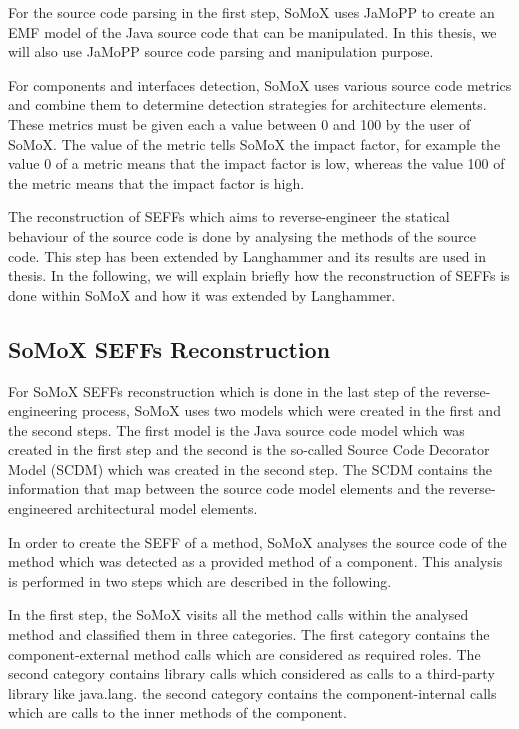 For the source code parsing in the first step, SoMoX uses JaMoPP to create an EMF model of the Java source code that can be manipulated. In this thesis, we will also use JaMoPP source code parsing and manipulation purpose.

For components and interfaces detection, SoMoX uses various source code metrics and combine them to determine detection strategies for architecture elements. These metrics must be given each a value between 0 and 100 by the user of SoMoX. The value of the metric tells SoMoX the impact factor, for example the value 0 of a metric means that the impact factor is low, whereas the value 100 of the metric means that the impact factor is high. 

The reconstruction of SEFFs which aims to reverse-engineer the statical behaviour of the source code is done by analysing the methods of the source code. This step has been extended by Langhammer \cite{langhammer2017automated} and its results are used in thesis. In the following, we will explain briefly how the reconstruction of SEFFs is done within SoMoX and how it was extended by Langhammer.

\subsection{SoMoX SEFFs Reconstruction}  
\label{sec:SoMoX SEFFs Reconstruction}
For SoMoX SEFFs reconstruction which is done in the last step of the reverse-engineering process, SoMoX uses two models which were created in the first and the second steps. The first model is the Java source code model which was created in the first step and the second is the so-called Source Code Decorator Model (SCDM) which was created in the second step. The SCDM contains the information that map between the source code model elements and the reverse-engineered architectural model elements.

In order to create the SEFF of a method, SoMoX analyses the source code of the method which was detected as a provided method of a component. This analysis is performed in two steps which are described in the following.

In the first step, the SoMoX visits all the method calls within the analysed method and classified them in three categories. The first category contains the component-external method calls which are considered as required roles. The second category contains library calls which considered as calls to a third-party library like java.lang. the second category contains the component-internal calls which are calls to the inner methods of the component. 

